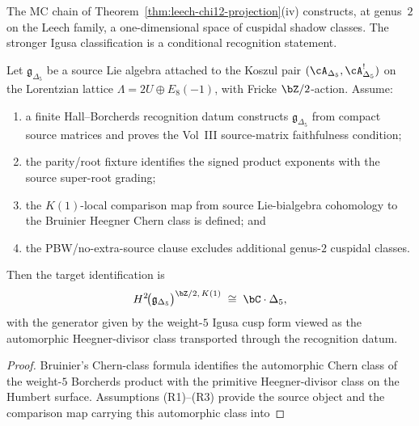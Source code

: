 \begin{remark}
\label{rem:arith-shad-2}%
%
%
%
%
The MC chain of Theorem~\ref{thm:leech-chi12-projection}(iv)
constructs, at genus~$2$ on the Leech family, a one-dimensional
space of cuspidal shadow classes. The stronger Igusa classification
is a conditional recognition statement.
\begin{proposition}\label{thm:h2-classification-delta5}%
Let $\mathfrak{g}_{\Delta_5}$ be a source Lie algebra attached to the
Koszul pair $(\cA_{\Delta_5},\cA_{\Delta_5}^!)$ on the Lorentzian
lattice $\Lambda=2U\oplus E_8(-1)$, with Fricke $\bZ/2$-action. Assume:
\begin{enumerate}[label=\textup{(R\arabic*)}]
\item a finite Hall--Borcherds recognition datum constructs
 $\mathfrak{g}_{\Delta_5}$ from compact source matrices and proves
 the Vol~III source-matrix faithfulness condition;
\item the parity/root fixture identifies the signed product exponents
 with the source super-root grading;
\item the $K(1)$-local comparison map from source Lie-bialgebra
 cohomology to the Bruinier Heegner Chern class is defined; and
\item the PBW/no-extra-source clause excludes additional
 genus-$2$ cuspidal classes.
\end{enumerate}
Then the target identification is
\begin{equation}\label{eq:h2-classification-delta5}
 H^2\!\bigl(\mathfrak{g}_{\Delta_5}\bigr)^{\bZ/2,\, K(1)}
 \;\cong\;
 \bC \cdot \Delta_5,
\end{equation}
with the generator given by the weight-$5$ Igusa cusp form viewed
as the automorphic Heegner-divisor class transported through the
recognition datum.
\end{proposition}
\begin{proof}
Bruinier's Chern-class formula \cite[Prop.~5.1]{Bruinier2002}
identifies the automorphic Chern class of the weight-$5$ Borcherds
product with the primitive Heegner-divisor class on the Humbert
surface. Assumptions \textup{(R1)--(R3)} provide the source object and
the comparison map carrying this automorphic class into

\end{proof}
\end{remark}
